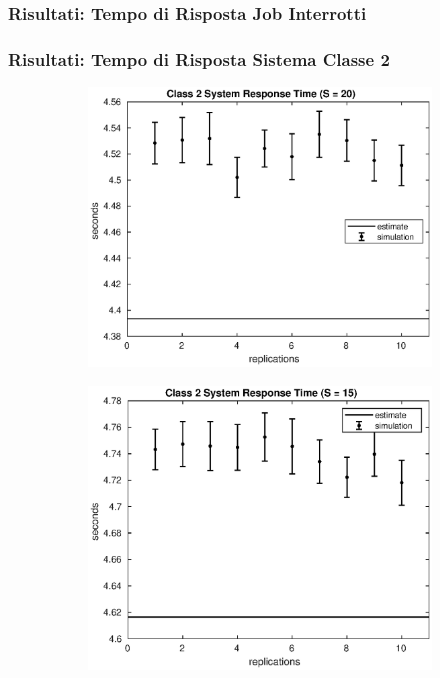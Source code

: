 \begin{frame}
\frametitle{Risultati: Tempo di Risposta Job Interrotti}

\end{frame}
\begin{frame}
\frametitle{Risultati: Tempo di Risposta Sistema Classe 2}
\begin{figure}[!h]
\centering
%
\begin{subfigure}[t]{0.49\textwidth}
\includegraphics[width=\textwidth]{../figures/simul/20_500K_s2}
\label{20_s2}
\end{subfigure}
%
\begin{subfigure}[t]{0.49\textwidth}
\includegraphics[width=\textwidth]{../figures/simul/15_500K_s2}

\end{subfigure}
\end{figure}
\end{frame}

